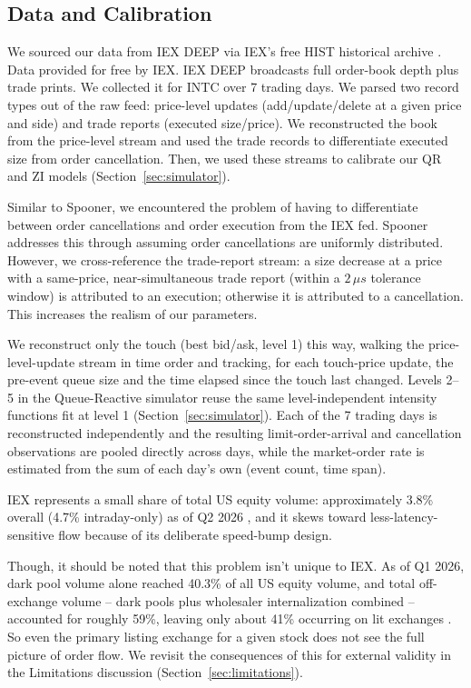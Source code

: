\documentclass{article}
\begin{document}
\subsection{Data and Calibration}

We sourced our data from IEX DEEP via IEX's free HIST historical archive \citep{iexhist2026}. Data provided for free by IEX. IEX DEEP broadcasts full order-book depth plus trade prints. We collected it for INTC over 7 trading days. We parsed two record types out of the raw feed: price-level updates (add/update/delete at a given price and side) and trade reports (executed size/price). We reconstructed the book from the price-level stream and used the trade records to differentiate executed size from order cancellation. Then, we used these streams to calibrate our QR and ZI models (Section~\ref{sec:simulator}).

Similar to Spooner, we encountered the problem of having to differentiate between order cancellations and order execution from the IEX fed. Spooner addresses this through assuming order cancellations are uniformly distributed. However, we cross-reference the trade-report stream: a size decrease at a price with a same-price, near-simultaneous trade report (within a $2\,\mu s$ tolerance window) is attributed to an execution; otherwise it is attributed to a cancellation. This increases the realism of our parameters.

We reconstruct only the touch (best bid/ask, level 1) this way, walking the price-level-update stream in time order and tracking, for each touch-price update, the pre-event queue size and the time elapsed since the touch last changed. Levels 2--5 in the Queue-Reactive simulator reuse the same level-independent intensity functions fit at level 1 (Section~\ref{sec:simulator}). Each of the 7 trading days is reconstructed independently and the resulting limit-order-arrival and cancellation observations are pooled directly across days, while the market-order rate is estimated from the sum of each day's own (event count, time span).

IEX represents a small share of total US equity volume: approximately 3.8\% overall (4.7\% intraday-only) as of Q2 2026 \citep{iexmarketshare2026}, and it skews toward less-latency-sensitive flow because of its deliberate speed-bump design.

Though, it should be noted that this problem isn't unique to IEX. As of Q1 2026, dark pool volume alone reached 40.3\% of all US equity volume, and total off-exchange volume -- dark pools plus wholesaler internalization combined -- accounted for roughly 59\%, leaving only about 41\% occurring on lit exchanges \citep{tradealgo2026}. So even the primary listing exchange for a given stock does not see the full picture of order flow. We revisit the consequences of this for external validity in the Limitations discussion (Section~\ref{sec:limitations}).
\end{document}
